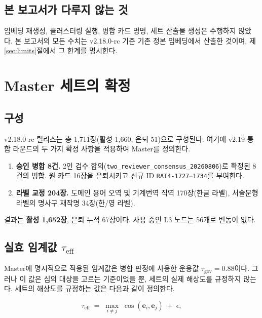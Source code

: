 \documentclass[11pt,a4paper]{article}
\begin{document}
\subsection{본 보고서가 다루지 않는 것}

임베딩 재생성, 클러스터링 실행, 병합 카드 명명, 세트 산출물 생성은 수행하지 않았다. 본 보고서의 모든 수치는 v2.18.0-rc 기준 기존 정본 임베딩에서 산출한 것이며, 제\ref{sec:limits}절에서 그 한계를 명시한다.

\section{Master 세트의 확정}

\subsection{구성}

v2.18.0-rc 릴리스는 총 1{,}711장(활성 1{,}660, 은퇴 51)으로 구성된다. 여기에 v2.19 통합 라운드의 두 가지 확정 사항을 적용하여 Master를 정의한다.

\begin{enumerate}[leftmargin=1.6em,itemsep=2pt]
  \item \textbf{승인 병합 8건.} 2인 검수 합의(\texttt{two\_reviewer\_consensus\_20260806})로 확정된 8건의 병합. 원 카드 16장을 은퇴시키고 신규 ID \texttt{RAI4-1727}--\texttt{1734}를 부여한다.
  \item \textbf{라벨 교정 204장.} 도메인 용어 오역 및 기계번역 직역 170장(한글 라벨), 서술문형 라벨의 명사구 재작명 34장(한/영 라벨).
\end{enumerate}

결과는 \textbf{활성 1{,}652장}, 은퇴 누적 67장이다. 사용 중인 L3 노드는 56개로 변동이 없다.

\subsection{실효 임계값 $\tau_{\mathrm{eff}}$}

Master에 명시적으로 적용된 임계값은 병합 판정에 사용한 운용값 $\tau_{\mathrm{gov}}=0.88$이다. 그러나 이 값은 심의 대상을 고르는 기준이었을 뿐, 세트의 실제 해상도를 규정하지 않는다. 세트의 해상도를 규정하는 값은 다음과 같이 정의한다.

\begin{equation}
\tau_{\mathrm{eff}} \;=\; \max_{i \neq j} \; \cos(\mathbf{e}_i, \mathbf{e}_j) \;+\; \epsilon,
\end{equation}
\end{document}
